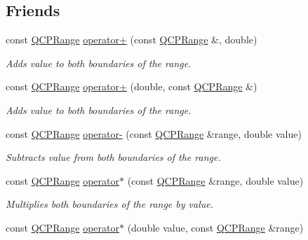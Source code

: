 \subsection*{Friends}
\begin{DoxyCompactItemize}
\item 
\hypertarget{classQCPRange_af53ea6fb823a4a5897162b865841de04}{}const \hyperlink{classQCPRange}{Q\+C\+P\+Range} \hyperlink{classQCPRange_af53ea6fb823a4a5897162b865841de04}{operator+} (const \hyperlink{classQCPRange}{Q\+C\+P\+Range} \&, double)\label{classQCPRange_af53ea6fb823a4a5897162b865841de04}

\begin{DoxyCompactList}\small\item\em Adds {\itshape value} to both boundaries of the range. \end{DoxyCompactList}\item 
\hypertarget{classQCPRange_a9fb2e9941d32001482df670c0d704977}{}const \hyperlink{classQCPRange}{Q\+C\+P\+Range} \hyperlink{classQCPRange_a9fb2e9941d32001482df670c0d704977}{operator+} (double, const \hyperlink{classQCPRange}{Q\+C\+P\+Range} \&)\label{classQCPRange_a9fb2e9941d32001482df670c0d704977}

\begin{DoxyCompactList}\small\item\em Adds {\itshape value} to both boundaries of the range. \end{DoxyCompactList}\item 
\hypertarget{classQCPRange_a797f82830b516646da8873f82e39e356}{}const \hyperlink{classQCPRange}{Q\+C\+P\+Range} \hyperlink{classQCPRange_a797f82830b516646da8873f82e39e356}{operator-\/} (const \hyperlink{classQCPRange}{Q\+C\+P\+Range} \&range, double value)\label{classQCPRange_a797f82830b516646da8873f82e39e356}

\begin{DoxyCompactList}\small\item\em Subtracts {\itshape value} from both boundaries of the range. \end{DoxyCompactList}\item 
\hypertarget{classQCPRange_a558b1248ff6a9e41fd5b2630555a8acc}{}const \hyperlink{classQCPRange}{Q\+C\+P\+Range} \hyperlink{classQCPRange_a558b1248ff6a9e41fd5b2630555a8acc}{operator$\ast$} (const \hyperlink{classQCPRange}{Q\+C\+P\+Range} \&range, double value)\label{classQCPRange_a558b1248ff6a9e41fd5b2630555a8acc}

\begin{DoxyCompactList}\small\item\em Multiplies both boundaries of the range by {\itshape value}. \end{DoxyCompactList}\item 
\hypertarget{classQCPRange_a5cb2332f6957021f47cc768089f4f090}{}const \hyperlink{classQCPRange}{Q\+C\+P\+Range} \hyperlink{classQCPRange_a5cb2332f6957021f47cc768089f4f090}{operator$\ast$} (double value, const \hyperlink{classQCPRange}{Q\+C\+P\+Range} \&range)\label{classQCPRange_a5cb2332f6957021f47cc768089f4f090}


\end{DoxyCompactItemize}
